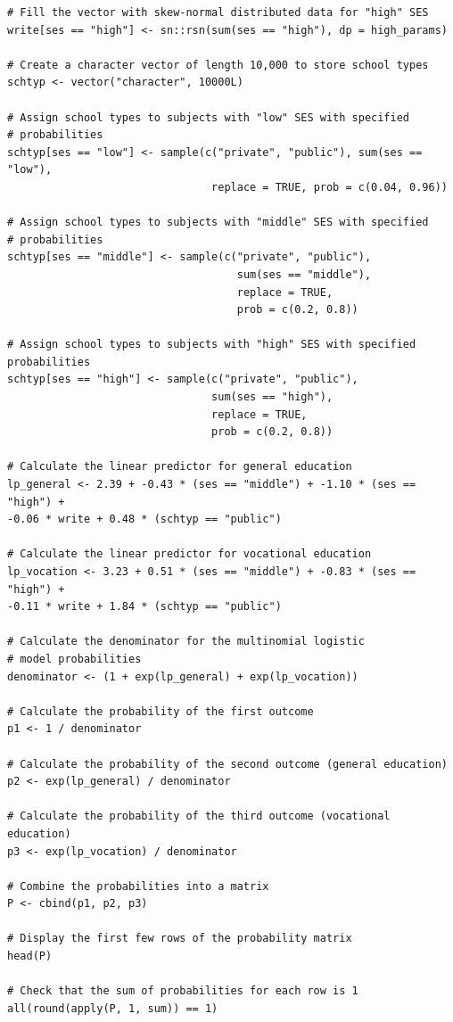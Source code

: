 \documentclass[12pt]{article}
\begin{document}
\begin{lstlisting}
# Fill the vector with skew-normal distributed data for "high" SES
write[ses == "high"] <- sn::rsn(sum(ses == "high"), dp = high_params)

# Create a character vector of length 10,000 to store school types
schtyp <- vector("character", 10000L)

# Assign school types to subjects with "low" SES with specified 
# probabilities
schtyp[ses == "low"] <- sample(c("private", "public"), sum(ses == "low"),
                                replace = TRUE, prob = c(0.04, 0.96))

# Assign school types to subjects with "middle" SES with specified 
# probabilities
schtyp[ses == "middle"] <- sample(c("private", "public"), 
                                    sum(ses == "middle"),
                                    replace = TRUE,
                                    prob = c(0.2, 0.8))

# Assign school types to subjects with "high" SES with specified 
probabilities
schtyp[ses == "high"] <- sample(c("private", "public"),
                                sum(ses == "high"),
                                replace = TRUE,
                                prob = c(0.2, 0.8))

# Calculate the linear predictor for general education
lp_general <- 2.39 + -0.43 * (ses == "middle") + -1.10 * (ses == "high") +
-0.06 * write + 0.48 * (schtyp == "public")

# Calculate the linear predictor for vocational education
lp_vocation <- 3.23 + 0.51 * (ses == "middle") + -0.83 * (ses == "high") +
-0.11 * write + 1.84 * (schtyp == "public")

# Calculate the denominator for the multinomial logistic 
# model probabilities
denominator <- (1 + exp(lp_general) + exp(lp_vocation))

# Calculate the probability of the first outcome
p1 <- 1 / denominator

# Calculate the probability of the second outcome (general education)
p2 <- exp(lp_general) / denominator

# Calculate the probability of the third outcome (vocational education)
p3 <- exp(lp_vocation) / denominator

# Combine the probabilities into a matrix
P <- cbind(p1, p2, p3)

# Display the first few rows of the probability matrix
head(P)

# Check that the sum of probabilities for each row is 1
all(round(apply(P, 1, sum)) == 1)


\end{lstlisting}
\end{document}

